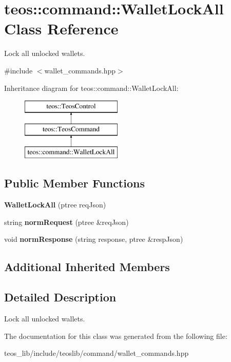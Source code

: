 \hypertarget{classteos_1_1command_1_1_wallet_lock_all}{}\section{teos\+:\+:command\+:\+:Wallet\+Lock\+All Class Reference}
\label{classteos_1_1command_1_1_wallet_lock_all}


Lock all unlocked wallets.  




{\ttfamily \#include $<$wallet\+\_\+commands.\+hpp$>$}

Inheritance diagram for teos\+:\+:command\+:\+:Wallet\+Lock\+All\+:\begin{figure}[H]
\begin{center}
\leavevmode
\includegraphics[height=3.000000cm]{classteos_1_1command_1_1_wallet_lock_all}
\end{center}
\end{figure}
\subsection*{Public Member Functions}
\begin{DoxyCompactItemize}
\item 
\mbox{\label{classteos_1_1command_1_1_wallet_lock_all_aaf4e6b212639281d2a5008a0ae798441}} 
{\bfseries Wallet\+Lock\+All} (ptree req\+Json)
\item 
\mbox{\label{classteos_1_1command_1_1_wallet_lock_all_a03ad4d17f33bec997d3c4d6ff67ea92a}} 
string {\bfseries norm\+Request} (ptree \&req\+Json)
\item 
\mbox{\label{classteos_1_1command_1_1_wallet_lock_all_abc6a2eb5f15f0f2e95b34ceb3f12339e}} 
void {\bfseries norm\+Response} (string response, ptree \&resp\+Json)
\end{DoxyCompactItemize}
\subsection*{Additional Inherited Members}


\subsection{Detailed Description}
Lock all unlocked wallets. 

The documentation for this class was generated from the following file\+:\begin{DoxyCompactItemize}
\item 
teos\+\_\+lib/include/teoslib/command/wallet\+\_\+commands.\+hpp\end{DoxyCompactItemize}
